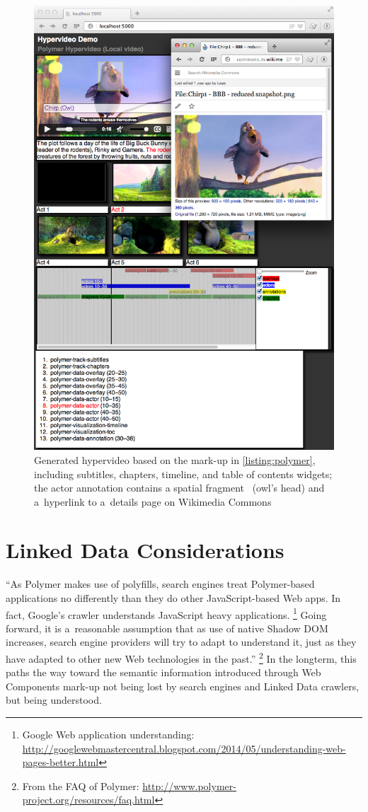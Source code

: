 \documentclass[runningheads,a4paper]{llncs}
\begin{document}
\begin{figure}[hbt]
  \centering
  \includegraphics[width=0.575\linewidth]{screenshot}
  \caption{Generated hypervideo based on the mark-up in \autoref{listing:polymer},
  including subtitles, chapters, timeline, and table of contents widgets;
  the actor annotation contains a spatial fragment~\cite{troncy2012mediafragments}
  (owl's head) and a~hyperlink
  to a~details page on Wikimedia Commons}
  \label{fig:screenshot}
\end{figure}

\section{Linked Data Considerations}

``As Polymer makes use of polyfills, search engines treat Polymer-based
applications no differently than they do other JavaScript-based Web apps.
In fact, Google’s crawler understands JavaScript heavy applications.%
\footnote{Google Web application understanding:
\url{http://googlewebmastercentral.blogspot.com/2014/05/understanding-web-pages-better.html}}
Going forward, it is a~reasonable assumption
that as use of native Shadow DOM increases,
search engine providers will try to adapt to understand it,
just as they have adapted to other new Web technologies in the past.''%
\footnote{From the FAQ of Polymer:
\url{http://www.polymer-project.org/resources/faq.html}}
In the longterm, this paths the way toward the semantic information
introduced through Web Components mark-up
not being lost by search engines and Linked Data crawlers,
but being understood.
\end{document}
